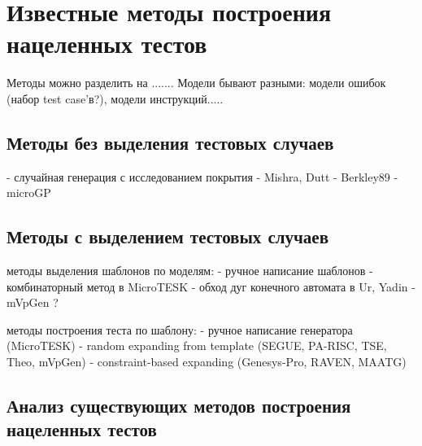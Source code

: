\documentclass[14pt]{extreport}
\begin{document}
\chapter{Известные методы построения нацеленных тестов}

Методы можно разделить на ....... Модели бывают разными: модели ошибок (набор test case'в?), модели инструкций.....

\section{Методы без выделения тестовых случаев}
- случайная генерация с исследованием покрытия
- Mishra, Dutt
- Berkley89
- microGP


\section{Методы с выделением тестовых случаев}

методы выделения шаблонов по моделям:
- ручное написание шаблонов
- комбинаторный метод в MicroTESK
- обход дуг конечного автомата в Ur, Yadin
- mVpGen ?

методы построения теста по шаблону:
- ручное написание генератора (MicroTESK)
- random expanding from template (SEGUE, PA-RISC, TSE, Theo, mVpGen)
- constraint-based expanding (Genesys-Pro, RAVEN, MAATG)

\section{Анализ существующих методов построения нацеленных тестов}
\end{document}
